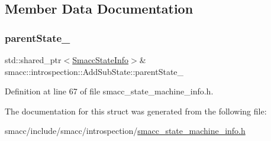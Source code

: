 \subsection{Member Data Documentation}
\mbox{\label{structsmacc_1_1introspection_1_1AddSubState_a17bd7a0edd62758b94907ecc3644cd29}} 
\subsubsection{\texorpdfstring{parent\+State\+\_\+}{parentState\_}}
{\footnotesize\ttfamily std\+::shared\+\_\+ptr$<$\hyperlink{classsmacc_1_1introspection_1_1SmaccStateInfo}{Smacc\+State\+Info}$>$\& smacc\+::introspection\+::\+Add\+Sub\+State\+::parent\+State\+\_\+}



Definition at line 67 of file smacc\+\_\+state\+\_\+machine\+\_\+info.\+h.



The documentation for this struct was generated from the following file\+:\begin{DoxyCompactItemize}
\item 
smacc/include/smacc/introspection/\hyperlink{smacc__state__machine__info_8h}{smacc\+\_\+state\+\_\+machine\+\_\+info.\+h}\end{DoxyCompactItemize}
